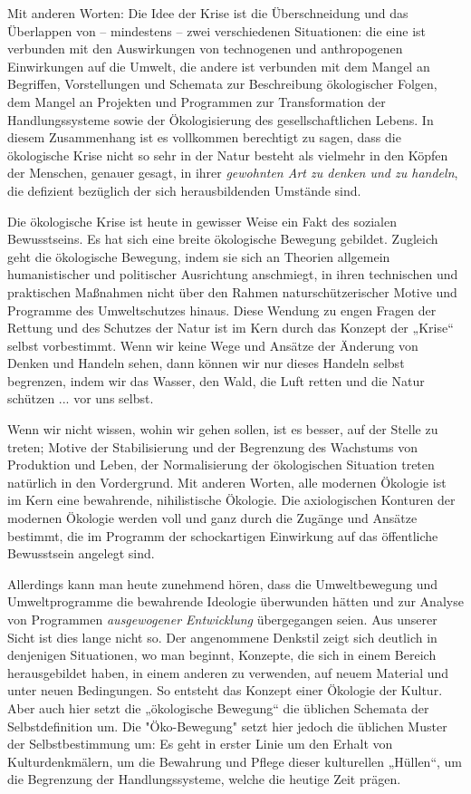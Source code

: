 \documentclass[11pt,a4paper]{article}
\begin{document}
Mit anderen Worten: Die Idee der Krise ist die Überschneidung und das
Überlappen von -- mindestens -- zwei verschiedenen Situationen: die eine ist
verbunden mit den Auswirkungen von technogenen und anthropogenen Einwirkungen
auf die Umwelt, die andere ist verbunden mit dem Mangel an Begriffen,
Vorstellungen und Schemata zur Beschreibung ökologischer Folgen, dem Mangel an
Projekten und Programmen zur Transformation der Handlungssysteme sowie der
Ökologisierung des gesellschaftlichen Lebens.  In diesem Zusammenhang ist es
vollkommen berechtigt zu sagen, dass die ökologische Krise nicht so sehr in
der Natur besteht als vielmehr in den Köpfen der Menschen, genauer gesagt, in
ihrer \emph{gewohnten Art zu denken und zu handeln}, die defizient bezüglich
der sich herausbildenden Umstände sind.

Die ökologische Krise ist heute in gewisser Weise ein Fakt des sozialen
Bewusstseins. Es hat sich eine breite ökologische Bewegung gebildet. Zugleich
geht die ökologische Bewegung, indem sie sich an Theorien allgemein
humanistischer und politischer Ausrichtung anschmiegt, in ihren technischen
und praktischen Maßnahmen nicht über den Rahmen naturschützerischer Motive und
Programme des Umweltschutzes hinaus.  Diese Wendung zu engen Fragen der
Rettung und des Schutzes der Natur ist im Kern durch das Konzept der „Krise“
selbst vorbestimmt. Wenn wir keine Wege und Ansätze der Änderung von Denken
und Handeln sehen, dann können wir nur dieses Handeln selbst begrenzen, indem
wir das Wasser, den Wald, die Luft retten und die Natur schützen ... vor uns
selbst.

Wenn wir nicht wissen, wohin wir gehen sollen, ist es besser, auf der Stelle
zu treten; Motive der Stabilisierung und der Begrenzung des Wachstums von
Produktion und Leben, der Normalisierung der ökologischen Situation treten
natürlich in den Vordergrund. Mit anderen Worten, alle modernen Ökologie ist
im Kern eine bewahrende, nihilistische Ökologie.  Die axiologischen Konturen
der modernen Ökologie werden voll und ganz durch die Zugänge und Ansätze
bestimmt, die im Programm der schockartigen Einwirkung auf das öffentliche
Bewusstsein angelegt sind.

Allerdings kann man heute zunehmend hören, dass die Umweltbewegung und
Umweltprogramme die bewahrende Ideologie überwunden hätten und zur Analyse von
Programmen \emph{ausgewogener Entwicklung} übergegangen seien. Aus unserer
Sicht ist dies lange nicht so.  Der angenommene Denkstil zeigt sich deutlich
in denjenigen Situationen, wo man beginnt, Konzepte, die sich in einem Bereich
herausgebildet haben, in einem anderen zu verwenden, auf neuem Material und
unter neuen Bedingungen. So entsteht das Konzept einer Ökologie der Kultur.
Aber auch hier setzt die „ökologische Bewegung“ die üblichen Schemata der
Selbstdefinition um.  Die "Öko-Bewegung" setzt hier jedoch die üblichen Muster
der Selbstbestimmung um: Es geht in erster Linie um den Erhalt von
Kulturdenkmälern, um die Bewahrung und Pflege dieser kulturellen „Hüllen“, um
die Begrenzung der Handlungssysteme, welche die heutige Zeit prägen.
\end{document}
